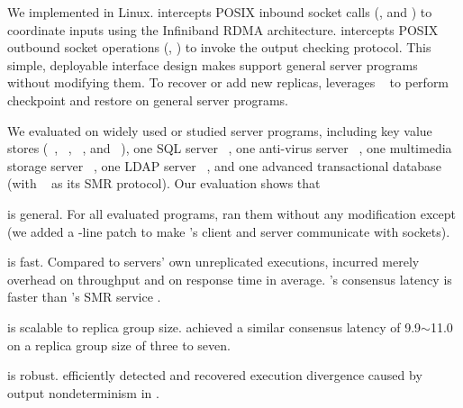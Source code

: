 We implemented \xxx in Linux. \xxx intercepts POSIX inbound socket calls 
(\eg, \accept and \recv) to coordinate inputs using the Infiniband 
RDMA architecture. \xxx intercepts POSIX outbound socket operations (\eg, 
\send) to invoke the output checking protocol. This simple, deployable 
interface design makes \xxx support general server programs without modifying 
them. To recover or add new replicas, \xxx leverages \criu~\cite{criu} to 
perform checkpoint and restore on general server programs.

We evaluated \xxx on \nprog widely used or studied server programs, including 
\nkvprog key value stores (\redis~\cite{redis}, \memcached~\cite{memcached}, 
\ssdb~\cite{ssdb}, and \mongodb~\cite{mongodb}), one SQL 
server \mysql~\cite{mysql}, one anti-virus server \clamav~\cite{clamav}, one 
multimedia storage server 
\mediatomb~\cite{mediatomb}, one LDAP server \openldap~\cite{openldap}, and one 
advanced transactional database 
\calvin~\cite{calvin:sigmod12} (with \zookeeper~\cite{zookeeper} as its SMR 
protocol). Our evaluation shows that

\begin{tightenum}
\item \xxx is general. For all evaluated programs, \xxx ran them without any 
modification except \calvin (we added a \nlinescalvin-line patch to make 
\calvin's client and server communicate with sockets).

\item \xxx is fast. Compared to servers' own unreplicated executions, 
\xxx incurred merely \tputoverhead overhead on throughput and \latencyoverhead 
on response time in average. \xxx's consensus latency is \fasterthanzookeeper 
faster than \calvin's SMR service \zookeeper.

\item \xxx is scalable to replica group size. \xxx achieved a similar 
consensus latency of 9.9$\sim$11.0 \us on a replica group size of three to 
seven.

\item \xxx is robust. \xxx efficiently detected and recovered execution 
divergence caused by output nondeterminism in \clamav.


\end{tightenum}  

